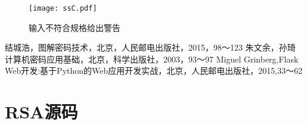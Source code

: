 \documentclass[UTF8,nofonts,cs4size]{ctexrep}
\begin{document}
\begin{figure}{}
\centering
\texttt{[image: ssC.pdf]}
\caption{输入不符合规格给出警告}
\end{figure}

\begin{thebibliography}{99}

结城浩，图解密码技术，北京，人民邮电出版社，2015，98～123
朱文余，孙琦 计算机密码应用基础，北京，科学出版社，2003，93～97
Miguel Grinberg,Flask Web开发:基于Python的Web应用开发实战，北京，人民邮电出版社，2015,33～62

\end{thebibliography}
\appendix



\chapter{RSA源码}
\end{document}
